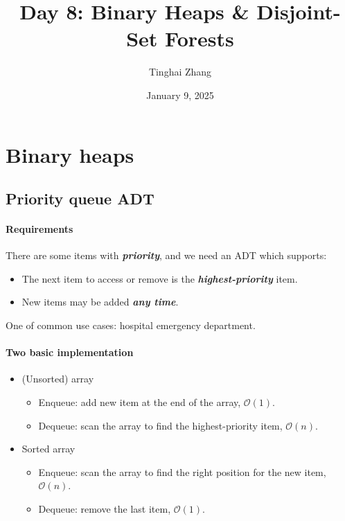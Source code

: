 \documentclass[12pt,a4paper]{ctexart}
\title{Day 8: Binary Heaps \& Disjoint-Set Forests}
\author{Tinghai Zhang}
\date{January 9, 2025}
\newcommand{\highlight}[1]{\textbf{\textit{#1}}}
\begin{document}
    \renewcommand{\baselinestretch}{1}
    \setlength{\abovedisplayskip}{5pt}
    \setlength{\belowdisplayskip}{5pt}
    \pagestyle{plain}

    \maketitle

    \tableofcontents

    \section{Binary heaps}

    \subsection{Priority queue ADT}

    \paragraph{Requirements}

    There are some items with \highlight{priority}, and we need an ADT which supports:

    \begin{itemize}
        \item The next item to access or remove is the \highlight{highest-priority} item.
        \item New items may be added \highlight{any time}.
    \end{itemize}

    One of common use cases: hospital emergency department.

    \paragraph{Two basic implementation}

    \begin{itemize}
        \item (Unsorted) array
        \begin{itemize}[left=1em]
            \item Enqueue: add new item at the end of the array, $\mathcal O(1)$.
            \item Dequeue: scan the array to find the highest-priority item, $\mathcal O(n)$.
        \end{itemize}
        \item Sorted array
        \begin{itemize}[left=1em]
            \item Enqueue: scan the array to find the right position for the new item, $\mathcal O(n)$.
            \item Dequeue: remove the last item, $\mathcal O(1)$.
        \end{itemize}
    \end{itemize}
\end{document}
